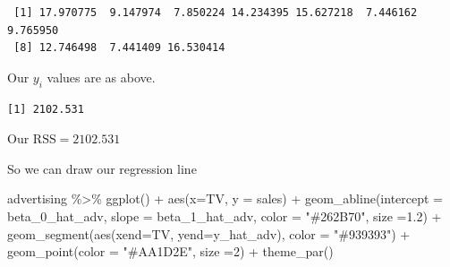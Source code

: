 \documentclass[
  letterpaper,
  DIV=11,
  numbers=noendperiod]{scrreprt}
\newenvironment{Shaded}{\begin{snugshade}}{\end{snugshade}}
\newcommand{\AttributeTok}[1]{\textcolor[rgb]{0.65,0.35,0.00}{#1}}
\newcommand{\DecValTok}[1]{\textcolor[rgb]{0.47,0.16,0.63}{#1}}
\newcommand{\FloatTok}[1]{\textcolor[rgb]{0.65,0.35,0.00}{#1}}
\newcommand{\FunctionTok}[1]{\textcolor[rgb]{0.02,0.16,0.49}{#1}}
\newcommand{\NormalTok}[1]{\textcolor[rgb]{0.33,0.33,0.33}{#1}}
\newcommand{\OtherTok}[1]{\textcolor[rgb]{0.85,0.12,0.09}{#1}}
\newcommand{\SpecialCharTok}[1]{\textcolor[rgb]{0.00,0.46,0.62}{#1}}
\newcommand{\StringTok}[1]{\textcolor[rgb]{0.00,0.50,0.00}{#1}}
\begin{document}
\begin{verbatim}
 [1] 17.970775  9.147974  7.850224 14.234395 15.627218  7.446162  9.765950
 [8] 12.746498  7.441409 16.530414
\end{verbatim}

Our \(y_i\) values are as above.

\begin{Shaded}
\end{Shaded}

\begin{verbatim}
[1] 2102.531
\end{verbatim}

Our \(\text{RSS} = 2102.531\)

So we can draw our regression line

\begin{Shaded}
\begin{Highlighting}[]
\NormalTok{advertising }\SpecialCharTok{\%\textgreater{}\%}
  \FunctionTok{ggplot}\NormalTok{() }\SpecialCharTok{+} \FunctionTok{aes}\NormalTok{(}\AttributeTok{x=}\NormalTok{TV, }\AttributeTok{y =}\NormalTok{ sales) }\SpecialCharTok{+}  \FunctionTok{geom\_abline}\NormalTok{(}\AttributeTok{intercept =}\NormalTok{ beta\_0\_hat\_adv, }\AttributeTok{slope =}\NormalTok{ beta\_1\_hat\_adv, }\AttributeTok{color =} \StringTok{"\#262B70"}\NormalTok{, }\AttributeTok{size =}\FloatTok{1.2}\NormalTok{) }\SpecialCharTok{+}
  \FunctionTok{geom\_segment}\NormalTok{(}\FunctionTok{aes}\NormalTok{(}\AttributeTok{xend=}\NormalTok{TV, }\AttributeTok{yend=}\NormalTok{y\_hat\_adv), }\AttributeTok{color =} \StringTok{"\#939393"}\NormalTok{) }\SpecialCharTok{+}
  \FunctionTok{geom\_point}\NormalTok{(}\AttributeTok{color =} \StringTok{"\#AA1D2E"}\NormalTok{, }\AttributeTok{size =}\DecValTok{2}\NormalTok{) }\SpecialCharTok{+} \FunctionTok{theme\_par}\NormalTok{()}
\end{Highlighting}
\end{Shaded}
\end{document}
